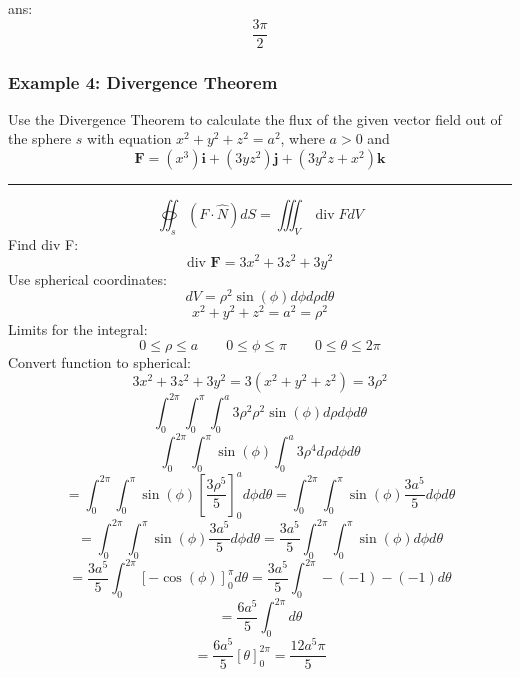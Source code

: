 ans:$$\frac{3\pi}{2}$$
\subsubsection{Example 4: Divergence Theorem}
Use the Divergence Theorem to calculate the flux of the given vector field out
of the sphere $s$ with equation $x^2 + y^2 + z^2 = a^2$, where $a > 0$ and
$$\mathbf{F}=(x^{3})\mathbf{i}+(3yz^{2})\mathbf{j}+(3y^2z+x^2)\mathbf{k}$$

\rule{\textwidth}{0.5pt}
$$\oiint_{s}(F \cdot \widehat{N}) d S=\iiint_V \operatorname{div} F d V$$
Find div F:
$$\text{div }\mathbf{F}=3x^2+3z^2+3y^2$$
Use spherical coordinates:
$$dV=\rho^2\sin(\phi)d\phi d\rho d\theta$$
$$x^2 + y^2 + z^2 = a^2=\rho^2$$
Limits for the integral:
$$0\leq \rho \leq a\qquad 0\leq\phi\leq \pi\qquad 0\leq\theta\leq 2\pi$$
Convert function to spherical:
$$3x^2+3z^2+3y^2=3(x^2+y^2+z^2)=3\rho^2$$
$$\int_0^{2\pi}\int_0^{\pi}\int_0^a3\rho^2\rho^2\sin(\phi)d\rho d\phi d\theta$$
$$\int_0^{2\pi}\int_0^{\pi}\sin(\phi)\int_0^a3\rho^4d\rho d\phi d\theta$$
$$=\int_0^{2\pi}\int_0^{\pi}\sin(\phi)\left[\frac{3\rho^5}{5} \right]_0^ad\phi d\theta=\int_0^{2\pi}\int_0^{\pi}\sin(\phi)\frac{3a^5}{5}d\phi d\theta$$
$$=\int_0^{2\pi}\int_0^{\pi}\sin(\phi)\frac{3a^5}{5}d\phi d\theta=\frac{3a^5}{5}\int_0^{2\pi}\int_0^{\pi}\sin(\phi)d\phi d\theta$$
$$=\frac{3a^5}{5}\int_0^{2\pi}\left[-\cos(\phi)\right]_0^\pi d\theta=\frac{3a^5}{5}\int_0^{2\pi}-(-1)-(-1) d\theta$$
$$=\frac{6a^5}{5}\int_0^{2\pi} d\theta$$
$$=\frac{6a^5}{5}\left[\theta\right]_0^{2\pi}=\frac{12a^5\pi}{5}$$
